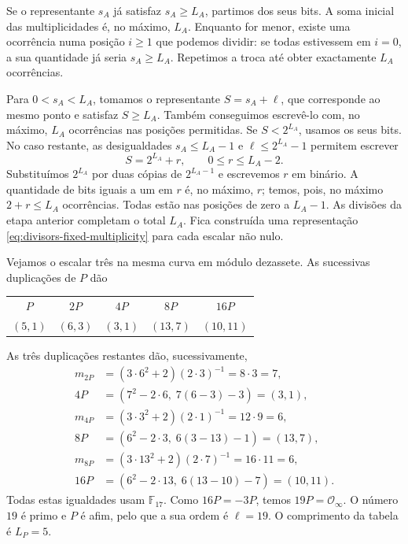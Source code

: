 Se o representante \(s_A\) já satisfaz \(s_A\geq L_A\),
partimos dos seus bits. A soma inicial das multiplicidades é, no
máximo, \(L_A\). Enquanto for menor, existe uma ocorrência numa
posição \(i\geq1\) que podemos dividir: se todas estivessem em
\(i=0\), a sua quantidade já seria \(s_A\geq L_A\).
Repetimos a troca até obter exactamente \(L_A\) ocorrências.

Para \(0<s_A<L_A\), tomamos o representante
\(S=s_A+\ell\), que corresponde ao mesmo ponto e satisfaz
\(S\geq L_A\). Também conseguimos escrevê-lo com, no máximo,
\(L_A\) ocorrências nas posições permitidas. Se \(S<2^{L_A}\),
usamos os seus bits. No caso restante, as desigualdades
\(s_A\leq L_A-1\) e \(\ell\leq2^{L_A}-1\) permitem escrever
\[
 S=2^{L_A}+r,\qquad 0\leq r\leq L_A-2.
\]
Substituímos \(2^{L_A}\) por duas cópias de \(2^{L_A-1}\)
e escrevemos \(r\) em binário. A quantidade de bits iguais a um
em \(r\) é, no máximo, \(r\); temos, pois, no máximo
\(2+r\leq L_A\) ocorrências. Todas estão nas posições de zero
a \(L_A-1\). As divisões da etapa anterior completam o total
\(L_A\). Fica construída uma representação
\eqref{eq:divisors-fixed-multiplicity} para cada escalar não nulo.

Vejamos o escalar três na mesma curva em módulo dezassete. As
sucessivas duplicações de \(P\) dão
\begin{center}
\begin{tabular}{c c c c c}
\(P\) & \(2P\) & \(4P\) & \(8P\) & \(16P\)\\[1mm]
\((5,1)\) & \((6,3)\) & \((3,1)\) & \((13,7)\) & \((10,11)\)
\end{tabular}
\end{center}
As três duplicações restantes dão, sucessivamente,
\begin{align*}
 m_{2P}&=(3\cdot6^2+2)(2\cdot3)^{-1}=8\cdot3=7,\\
 4P&=(7^2-2\cdot6,\;7(6-3)-3)=(3,1),\\
 m_{4P}&=(3\cdot3^2+2)(2\cdot1)^{-1}=12\cdot9=6,\\
 8P&=(6^2-2\cdot3,\;6(3-13)-1)=(13,7),\\
 m_{8P}&=(3\cdot13^2+2)(2\cdot7)^{-1}=16\cdot11=6,\\
 16P&=(6^2-2\cdot13,\;6(13-10)-7)=(10,11).
\end{align*}
Todas estas igualdades usam \(\mathbb F_{17}\). Como
\(16P=-3P\), temos \(19P=\mathcal O_\infty\). O número
\(19\) é primo e \(P\) é afim, pelo que a sua ordem é
\(\ell=19\). O comprimento da tabela é \(L_P=5\).

